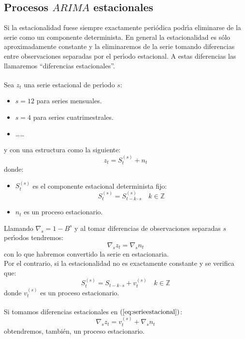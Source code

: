 %
%

\subsection{Procesos $ARIMA$ estacionales}

Si la estacionalidad fuese siempre exactamente peri\'odica podr\'{\i}a
eliminarse de la serie como un componente determinista. En general la
estacionalidad es s\'olo aproximadamente constante y la eliminaremos de la serie
tomando diferencias entre observaciones separadas por el per\'{\i}odo
estacional. A estas diferencias las llamaremos ``diferencias estacionales''.%
\\ \\
%
Sea $z_t$ una serie estacional de per\'{\i}odo $s$:
\begin{itemize}
\item $s=12$ para series mensuales.
\item $s=4$ para series cuatrimestrales.
\item \dots\dots
\end{itemize}
y con una estructura como la siguiente:
\begin{equation}\label{eq:serieestacional}
z_t=S_t^{(s)}+n_t
\end{equation}
donde:
\begin{itemize}
\item $S_t^{(s)}$ es el componente estacional determinista fijo:
\begin{displaymath}
S_t^{(s)}=S_{t-k\cdot s}^{(s)}\quad k\in \mathbb{Z}
\end{displaymath}
\item $n_t$ es un proceso estacionario.
\end{itemize}
Llamando $\nabla_s=1-B^s$ y al tomar diferencias de observaciones separadas
$s$ per\'{\i}odos tendremos:
\begin{displaymath}
\nabla_s z_t = \nabla_s n_t
\end{displaymath}
con lo que habremos convertido la serie en estacionaria.\\

Por el contrario, si la estacionalidad no es exactamente constante y se
verifica que:
\begin{displaymath}
S_t^{(s)}=S_{t-k\cdot s} + v_t^{(s)}\quad k\in \mathbb{Z}
\end{displaymath}
donde $v_t^{(s)}$ es un proceso estacionario.\\ \\
%
Si tomamos diferencias estacionales en $(\ref{eq:serieestacional})$:
\begin{displaymath}
\nabla_s z_t = v_t^{(s)}+\nabla_s n_t
\end{displaymath}
obtendremos, tambi\'en, un proceso estacionario.\\

